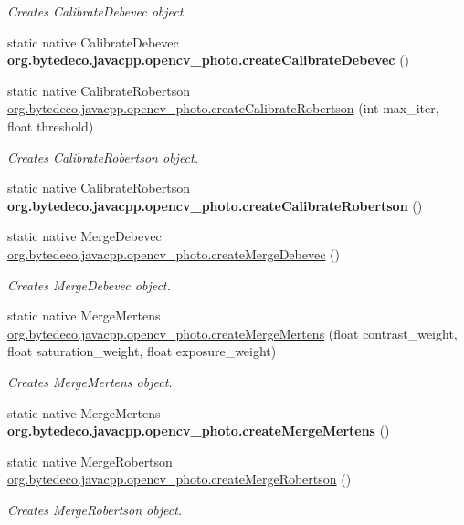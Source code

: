 \begin{DoxyCompactItemize}
\begin{DoxyCompactList}\small\item\em Creates Calibrate\+Debevec object. \end{DoxyCompactList}\item 
\mbox{\label{group__photo__hdr_ga3b370075247e9bd2f724b316ad9970f3}} 
static native Calibrate\+Debevec {\bfseries org.\+bytedeco.\+javacpp.\+opencv\+\_\+photo.\+create\+Calibrate\+Debevec} ()
\item 
static native Calibrate\+Robertson \hyperlink{group__photo__hdr_ga1ac32f0f1042b3436bd7daf88bb48760}{org.\+bytedeco.\+javacpp.\+opencv\+\_\+photo.\+create\+Calibrate\+Robertson} (int max\+\_\+iter, float threshold)
\begin{DoxyCompactList}\small\item\em Creates Calibrate\+Robertson object. \end{DoxyCompactList}\item 
\mbox{\label{group__photo__hdr_ga3032d7fe6e15a35aa4722340e887ca17}} 
static native Calibrate\+Robertson {\bfseries org.\+bytedeco.\+javacpp.\+opencv\+\_\+photo.\+create\+Calibrate\+Robertson} ()
\item 
\mbox{\label{group__photo__hdr_ga90dac3606f6344e591968df25cd8ace6}} 
static native Merge\+Debevec \hyperlink{group__photo__hdr_ga90dac3606f6344e591968df25cd8ace6}{org.\+bytedeco.\+javacpp.\+opencv\+\_\+photo.\+create\+Merge\+Debevec} ()
\begin{DoxyCompactList}\small\item\em Creates Merge\+Debevec object. \end{DoxyCompactList}\item 
static native Merge\+Mertens \hyperlink{group__photo__hdr_ga7f47cc9c6b5e72f9fbf7281271dfc426}{org.\+bytedeco.\+javacpp.\+opencv\+\_\+photo.\+create\+Merge\+Mertens} (float contrast\+\_\+weight, float saturation\+\_\+weight, float exposure\+\_\+weight)
\begin{DoxyCompactList}\small\item\em Creates Merge\+Mertens object. \end{DoxyCompactList}\item 
\mbox{\label{group__photo__hdr_ga30b2c33f0028b54182b84964d6258390}} 
static native Merge\+Mertens {\bfseries org.\+bytedeco.\+javacpp.\+opencv\+\_\+photo.\+create\+Merge\+Mertens} ()
\item 
\mbox{\label{group__photo__hdr_ga658fdc1c45f60d70951e9364b7a974ae}} 
static native Merge\+Robertson \hyperlink{group__photo__hdr_ga658fdc1c45f60d70951e9364b7a974ae}{org.\+bytedeco.\+javacpp.\+opencv\+\_\+photo.\+create\+Merge\+Robertson} ()
\begin{DoxyCompactList}\small\item\em Creates Merge\+Robertson object. \end{DoxyCompactList}\end{DoxyCompactItemize}
